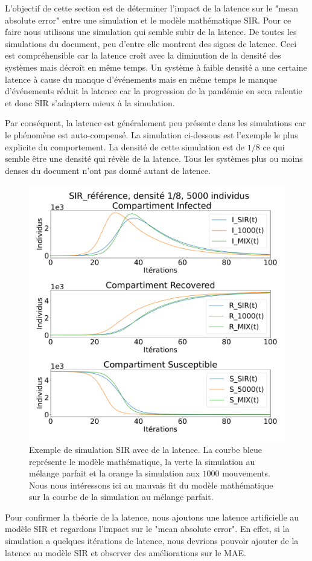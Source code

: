 L'objectif de cette section est de déterminer l'impact de la latence sur le "mean absolute error" entre une simulation et le modèle mathématique SIR. Pour ce faire nous utilisons une simulation qui semble subir de la latence. De toutes les simulations du document, peu d'entre elle montrent des signes de latence. Ceci est compréhensible car la latence croît avec la diminution de la densité des systèmes mais décroît en même temps. Un système à faible densité a une certaine latence à cause du manque d'événements mais en même temps le manque d'événements réduit la latence car la progression de la pandémie en sera ralentie et donc SIR s'adaptera mieux à la simulation.\\

\newpage 

Par conséquent, la latence est généralement peu présente dans les simulations car le phénomène est auto-compensé. La simulation ci-dessous est l'exemple le plus explicite du comportement. La densité de cette simulation est de $1/8$ ce qui semble être une densité qui révèle de la latence. Tous les systèmes plus ou moins denses du document n'ont pas donné autant de latence.

\begin{figure}[h]
	\centering
	\captionsetup{justification=centering}
	\includegraphics[width=.6\textwidth]{Images/SIR_ref_8_5.pdf}
	\caption[Simulation SIR avec latence]{Exemple de simulation SIR avec de la latence. La courbe bleue représente le modèle mathématique, la verte la simulation au mélange parfait et la orange la simulation aux $1000$ mouvements. Nous nous intéressons ici au mauvais fit du modèle mathématique sur la courbe de la simulation au mélange parfait.}
\end{figure}

Pour confirmer la théorie de la latence, nous ajoutons une latence artificielle au modèle SIR et regardons l'impact sur le "mean absolute error". En effet, si la simulation a quelques itérations de latence, nous devrions pouvoir ajouter de la latence au modèle SIR et observer des améliorations sur le MAE.

